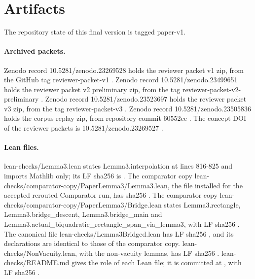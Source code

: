 \section{Artifacts}\label{sec:artifacts}

The repository state of this final version is tagged paper-v1.

\paragraph{Archived packets.}
Zenodo record 10.5281/zenodo.23269528 holds the reviewer packet v1 zip, from the GitHub tag reviewer-packet-v1 \cite{zenodo-23269528}.
Zenodo record 10.5281/zenodo.23499651 holds the reviewer packet v2 preliminary zip, from the tag reviewer-packet-v2-preliminary \cite{zenodo-23499651}.
Zenodo record 10.5281/zenodo.23523697 holds the reviewer packet v3 zip, from the tag reviewer-packet-v3 \cite{zenodo-23523697}.
Zenodo record 10.5281/zenodo.23505836 holds the corpus replay zip, from repository commit 60552ee \cite{zenodo-23505836}.
The concept DOI of the reviewer packets is 10.5281/zenodo.23269527 \cite{zenodo-23269527}.

\paragraph{Lean files.}
lean-checks/Lemma3.lean states Lemma3.interpolation at lines 816-825 and imports Mathlib only; its LF sha256 is .
The comparator copy lean-checks/comparator-copy/PaperLemma3/Lemma3.lean, the file installed for the accepted rerouted Comparator run, has sha256 .
The comparator copy lean-checks/comparator-copy/PaperLemma3/Bridge.lean states Lemma3.rectangle, Lemma3.bridge\_descent, Lemma3.bridge\_main and Lemma3.actual\_biquadratic\_rectangle\_span\_via\_lemma3, with LF sha256 .
The canonical file lean-checks/Lemma3Bridged.lean has LF sha256 , and its declarations are identical to those of the comparator copy.
lean-checks/NonVacuity.lean, with the non-vacuity lemmas, has LF sha256 .
lean-checks/README.md gives the role of each Lean file; it is committed at , with LF sha256 .

